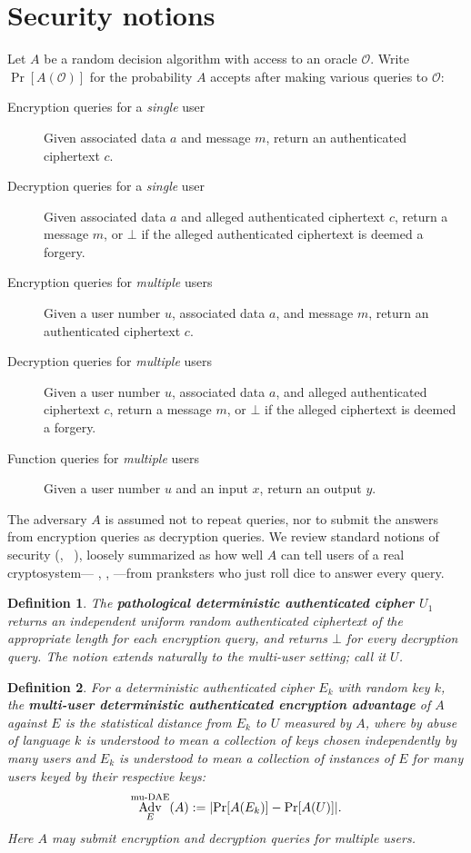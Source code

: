 \documentclass[draft]{article}
\newtheorem{definition}{Definition}
\newcommand{\term}[1]{\textbf{#1}}
\def\operatorsc#1{{%
  \ifmmode\let\next=\operatorname\else\let\next=\relax\fi\next{\textsc{#1}}}}
\def\XSalsa#1/{\operatorsc{XSalsa#1}}
\def\DAENCE/{\operatorsc{Daence}}
\def\muDAE{%
  \ifmmode\def\next{\operatorname{mu-DAE}}%
    \else\def\next/{mu-\textsc{dae}}%
  \fi\next}
\DeclareMathOperator{\Adv}{Adv}
\begin{document}
\section{Security notions}

Let $A$ be a random decision algorithm with access to an oracle
 $\mathcal O$.
Write $\Pr[A(\mathcal O)]$ for the probability $A$ accepts after
 making various queries to $\mathcal O$:
%
\begin{description}
  \item[Encryption queries for a \emph{single} user]
    Given associated data $a$ and message $m$, return an authenticated
     ciphertext $c$.
  \item[Decryption queries for a \emph{single} user]
    Given associated data $a$ and alleged authenticated ciphertext
     $c$, return a message $m$, or $\bot$ if the alleged authenticated
     ciphertext is deemed a forgery.
  \item[Encryption queries for \emph{multiple} users]
    Given a user number $u$, associated data $a$, and message $m$,
     return an authenticated ciphertext $c$.
  \item[Decryption queries for \emph{multiple} users]
    Given a user number $u$, associated data $a$, and alleged
     authenticated ciphertext $c$, return a message $m$, or $\bot$ if
     the alleged ciphertext is deemed a forgery.
  \item[Function queries for \emph{multiple} users]
    Given a user number $u$ and an input $x$, return an output $y$.
\end{description}
%
The adversary $A$ is assumed not to repeat queries, nor to submit the
 answers from encryption queries as decryption queries.
We review standard notions of security
 (\eg,~%
  \cite[Definition~1]{rogaway-shrimpton2006keywrap}%
  \cite[\S3]{bellare-tackmann2016mu-ae-crypto}),
 loosely summarized as how well $A$ can tell users of a real
 cryptosystem---\DAENCE/, \XSalsa20/, \etc---from pranksters who just
 roll dice to answer every query.

\begin{definition}
  The \term{pathological deterministic authenticated cipher $U_1$}
   returns an independent uniform random authenticated ciphertext of
   the appropriate length for each encryption query, and returns
   $\bot$ for every decryption query.
  The notion extends naturally to the multi-user setting; call it
   $U$.
\end{definition}

\begin{definition}
  For a deterministic authenticated cipher $E_k$ with random key $k$,
   the
   \term{multi-user deterministic authenticated encryption advantage}
   of $A$ against $E$ is the statistical distance from $E_k$ to $U$
   measured by $A$, where by abuse of language $k$ is understood to
   mean a collection of keys chosen independently by many users and
   $E_k$ is understood to mean a collection of instances of $E$ for
   many users keyed by their respective keys:
  \[
    \Adv^{\muDAE}_E(A) := \lvert\Pr[A(E_k)] - \Pr[A(U)]\rvert.
  \]
  Here $A$ may submit encryption and decryption queries for
   \emph{multiple} users.
\end{definition}
\end{document}
